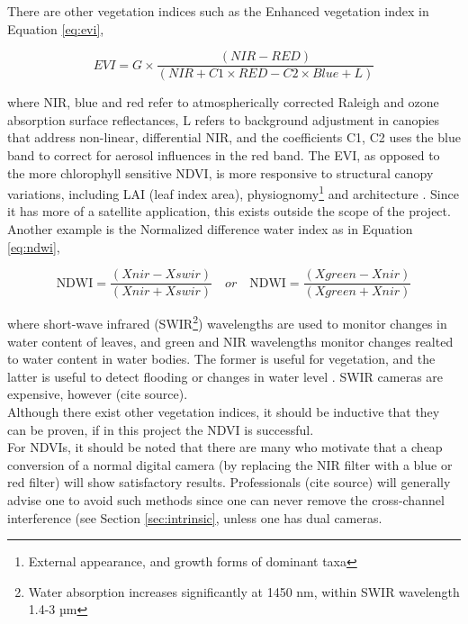 There are other vegetation indices such as the Enhanced vegetation index in Equation \ref{eq:evi},

\begin{equation}\label{eq:evi}
EVI=G\times {\frac  {(NIR-RED)}{(NIR+C1\times RED-C2\times Blue+L)}}
\end{equation}

where NIR, blue and red refer to atmospherically corrected Raleigh and ozone absorption surface reflectances, L refers to background adjustment in canopies that address non-linear, differential NIR, and the coefficients C1, C2 uses the blue band to correct for aerosol influences in the red band. The EVI, as opposed to the more chlorophyll sensitive NDVI, is more responsive to structural canopy variations, including LAI (leaf index area), physiognomy\footnote{External appearance, and growth forms of dominant taxa} and architecture \cite{evi}. Since it has more of a satellite application, this exists outside the scope of the project.\\

Another example is the Normalized difference water index as in Equation \ref{eq:ndwi},

\begin{equation}\label{eq:ndwi}
{\displaystyle {\mbox{NDWI}}={\frac {(Xnir-Xswir)}{(Xnir+Xswir)}}}\quad or\quad {\displaystyle {\mbox{NDWI}}={\frac {(Xgreen-Xnir)}{(Xgreen+Xnir)}}}
\end{equation}

where short-wave infrared (SWIR\footnote{Water absorption increases significantly at 1450 nm, within SWIR wavelength 1.4-3 µm}) wavelengths are used to monitor changes in water content of leaves, and green and NIR wavelengths monitor changes realted to water content in water bodies. The former is useful for vegetation, and the latter is useful to detect flooding or changes in water level \cite{ndwi}. SWIR cameras are expensive, however (cite source).\\

Although there exist other vegetation indices, it should be inductive that they can be proven, if in this project the NDVI is successful.\\

For NDVIs, it should be noted that there are many who motivate that a cheap conversion of a normal digital camera (by replacing the NIR filter with a blue or red filter) will show satisfactory results. Professionals (cite source) will generally advise one to avoid such methods since one can never remove the cross-channel interference (see Section \ref{sec:intrinsic}, unless one has dual cameras.\\

